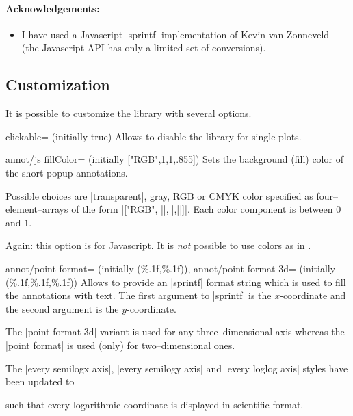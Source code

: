 	\paragraph{Acknowledgements:}
	\begin{itemize}
		\item I have used a Javascript |sprintf| implementation of Kevin van Zonneveld~\cite{phptojs} (the Javascript API has only a limited set of conversions).
	\end{itemize}


\subsection{Customization}
It is possible to customize the library with several options.

\begin{pgfplotskey}{clickable= (initially true)}
	Allows to disable the library for single plots.
\end{pgfplotskey}

\begin{pgfplotskey}{annot/js fillColor= (initially ["RGB",1,1,.855])}
	Sets the background (fill) color of the short popup annotations. 
	
	Possible choices are |transparent|, gray, RGB or CMYK color specified as four--element--arrays of the form
	|["RGB", ||,||,||]|. Each color component is between $0$ and $1$.

	Again: this option is for Javascript. It is \emph{not} possible to use colors as in \pgfname.
\end{pgfplotskey}

\begin{pgfplotskeylist}{%
	annot/point format= (initially {(\%.1f,\%.1f)}),
	annot/point format 3d= (initially {(\%.1f,\%.1f,\%.1f)})}
	Allows to provide an |sprintf| format string which is used to fill the annotations with text. 
	The first argument to |sprintf| is the $x$-coordinate and the second argument is the $y$-coordinate.

	The |point format 3d| variant is used for any three--dimensional axis whereas the |point format| is used (only) for two--dimensional ones.

	The |every semilogx axis|, |every semilogy axis| and |every loglog axis| styles have been updated to
\begin{codeexample}
\end{codeexample}
	\noindent such that every logarithmic coordinate is displayed in scientific format.
\end{pgfplotskeylist}

